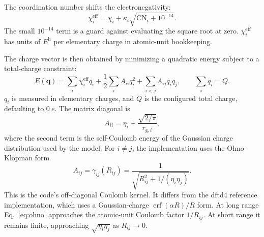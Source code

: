 \documentclass[11pt]{article}
\begin{document}
The coordination number shifts the electronegativity:
\begin{equation}
  \chi^{\mathrm{eff}}_i =
  \chi_i + \kappa_i\sqrt{\mathrm{CN}_i+10^{-14}} .
  \label{eq:chieff}
\end{equation}
The small \(10^{-14}\) term is a guard against evaluating the square root at
zero. \(\chi^{\mathrm{eff}}_i\) has units of \(\si{\hartree}\) per elementary
charge in atomic-unit bookkeeping.

The charge vector is then obtained by minimizing a quadratic energy subject to
a total-charge constraint:
\begin{equation}
  E(\bm q)=
  \sum_i \chi^{\mathrm{eff}}_i q_i
  + \frac{1}{2}\sum_i A_{ii}q_i^2
  + \sum_{i<j}A_{ij}q_iq_j ,
  \qquad \sum_i q_i = Q .
  \label{eq:energy}
\end{equation}
\(q_i\) is measured in elementary charges, and \(Q\) is the configured total
charge, defaulting to \(\SI{0}{\elementarycharge}\). The matrix diagonal is
\begin{equation}
  A_{ii}=\eta_i+\frac{\sqrt{2/\pi}}{r_{\mathrm{g},i}},
  \label{eq:adiag}
\end{equation}
where the second term is the self-Coulomb energy of the Gaussian charge
distribution used by the model. For \(i\ne j\), the implementation uses the
Ohno--Klopman form
\begin{equation}
  A_{ij}=\gamma_{ij}(R_{ij})
  =
  \frac{1}{\sqrt{R_{ij}^2+1/(\eta_i\eta_j)}} .
  \label{eq:ohno}
\end{equation}
This is the code's off-diagonal Coulomb kernel. It differs from the dftd4
reference implementation, which uses a Gaussian-charge
\(\operatorname{erf}(\alpha R)/R\) form. At long range
Eq.~\eqref{eq:ohno} approaches the atomic-unit Coulomb factor \(1/R_{ij}\). At
short range it remains finite, approaching \(\sqrt{\eta_i\eta_j}\) as
\(R_{ij}\to0\).
\end{document}
